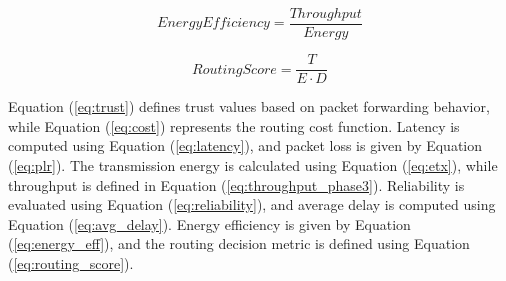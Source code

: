 \documentclass[a4paper,fleqn]{cas-dc}
\numberwithin{equation}{section}
\begin{document}
\begin{equation}
EnergyEfficiency = \frac{Throughput}{Energy}
\label{eq:energy_eff}
\end{equation}

\begin{equation}
RoutingScore = \frac{T}{E \cdot D}
\label{eq:routing_score}
\end{equation}

Equation (\ref{eq:trust}) defines trust values based on packet forwarding behavior, while Equation (\ref{eq:cost}) represents the routing cost function. Latency is computed using Equation (\ref{eq:latency}), and packet loss is given by Equation (\ref{eq:plr}). The transmission energy is calculated using Equation (\ref{eq:etx}), while throughput is defined in Equation (\ref{eq:throughput_phase3}). Reliability is evaluated using Equation (\ref{eq:reliability}), and average delay is computed using Equation (\ref{eq:avg_delay}). Energy efficiency is given by Equation (\ref{eq:energy_eff}), and the routing decision metric is defined using Equation (\ref{eq:routing_score}).
\end{document}
